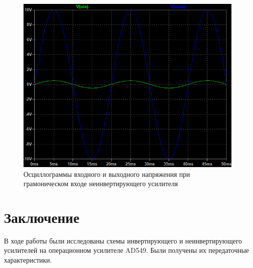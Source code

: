 \begin{figure}[H]
    \centering
    \includegraphics[width=\textwidth]{figs/иссл_раб_неинв_усл.png}
    \caption{Осциллограммы входного
    и выходного напряжения при грамоническом входе неинвертирующего усилителя}
    \label{fig:иссл_раб_неинв_усл}
\end{figure}


\section*{Заключение}

В ходе работы были исследованы схемы инвертирующего и неинвертирующего усилителей
на операционном усилителе AD549. Были получены их передаточные характеристики.

